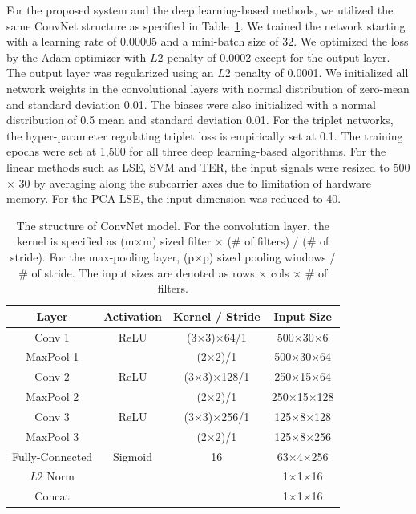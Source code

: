 \documentclass{sig-alternate-05-2015}
\begin{document}
For the proposed system and the deep learning-based methods, we utilized the same ConvNet structure as specified in Table~\ref{tab1}. We trained the network starting with a learning rate of 0.00005 and a mini-batch size of 32. We optimized the loss by the Adam optimizer with $L2$ penalty of 0.0002 except for the output layer. The output layer was regularized using an $L2$ penalty of 0.0001. We initialized all network weights in the convolutional layers with normal distribution of zero-mean and standard deviation 0.01. The biases were also initialized with a normal distribution of 0.5 mean and standard deviation 0.01. For the triplet networks, the hyper-parameter regulating triplet loss is empirically set at 0.1. The training epochs were set at 1,500 for all three deep learning-based algorithms. For the linear methods such as LSE, SVM and TER, the input signals were resized to 500 $\times$ 30 by averaging along the subcarrier axes due to limitation of hardware memory. For the PCA-LSE, the input dimension was reduced to 40.
\begin{table}
\centering
    \caption{The structure of ConvNet model. For the convolution layer, the kernel is specified as (m$\times$m) sized filter $\times$ (\# of filters) / (\# of stride). For the max-pooling layer, (p$\times$p) sized pooling windows / \# of stride. The input sizes are denoted as rows $\times$ cols $\times$ \# of filters.}
    \label{tab1}
    \begin{tabular}{|c|c|c|c|} \hline
     Layer     & Activation & Kernel / Stride & Input Size \\ \hline
     Conv 1    & ReLU       & (3$\times$3)$\times$64/1      & 500$\times$30$\times$6   \\ \hline
     MaxPool 1 &            & (2$\times$2)/1         & 500$\times$30$\times$64  \\ \hline
     Conv 2    & ReLU       & (3$\times$3)$\times$128/1     & 250$\times$15$\times$64 \\ \hline
     MaxPool 2 &            & (2$\times$2)/1         & 250$\times$15$\times$128 \\ \hline
     Conv 3    & ReLU       & (3$\times$3)$\times$256/1     & 125$\times$8$\times$128  \\ \hline
     MaxPool 3 &            & (2$\times$2)/1         & 125$\times$8$\times$256  \\ \hline
     Fully-Connected     & Sigmoid    & 16             & 63$\times$4$\times$256   \\ \hline
     $L2$ Norm  &            &                 & 1$\times$1$\times$16    \\ \hline
     Concat    &            &                 & 1$\times$1$\times$16    \\ \hline
    \end{tabular}
\end{table}
\end{document}
